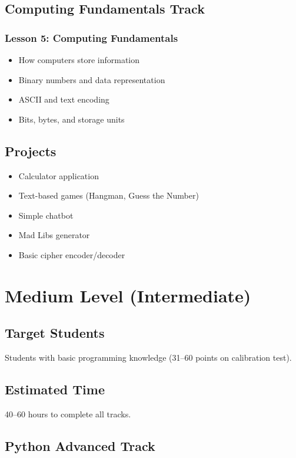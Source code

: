\documentclass[11pt,letterpaper]{article}
\begin{document}
\subsection{Computing Fundamentals Track}

\subsubsection{Lesson 5: Computing Fundamentals}
\begin{itemize}[leftmargin=*]
    \item How computers store information
    \item Binary numbers and data representation
    \item ASCII and text encoding
    \item Bits, bytes, and storage units
\end{itemize}

\subsection{Projects}
\begin{itemize}[leftmargin=*]
    \item Calculator application
    \item Text-based games (Hangman, Guess the Number)
    \item Simple chatbot
    \item Mad Libs generator
    \item Basic cipher encoder/decoder
\end{itemize}

\section{Medium Level (Intermediate)}

\subsection{Target Students}
Students with basic programming knowledge (31--60 points on calibration test).

\subsection{Estimated Time}
40--60 hours to complete all tracks.

\subsection{Python Advanced Track}
\end{document}
